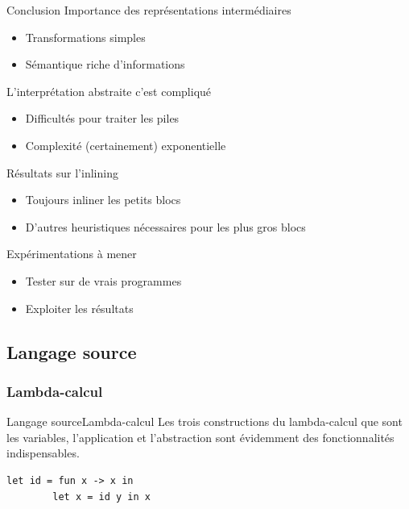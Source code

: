 \documentclass{beamer}
\begin{document}
\begin{frame}{Conclusion}
    Importance des représentations intermédiaires

    \begin{itemize}
        \item Transformations simples
        \item Sémantique riche d'informations
    \end{itemize}

    L'interprétation abstraite c'est compliqué

    \begin{itemize}
        \item Difficultés pour traiter les piles
        \item Complexité (certainement) exponentielle
    \end{itemize}

    Résultats sur l'inlining

    \begin{itemize}
        \item Toujours inliner les petits blocs
        \item D'autres heuristiques nécessaires pour les plus gros blocs
    \end{itemize}

    Expérimentations à mener

    \begin{itemize}
        \item Tester sur de vrais programmes
        \item Exploiter les résultats
    \end{itemize}
\end{frame}



\iffalse
\subsection{Langage source}

\subsubsection{Lambda-calcul}

\begin{frame}[fragile]{Langage source}{Lambda-calcul}
    Les trois constructions du lambda-calcul que sont les variables, l'application et l'abstraction sont évidemment des fonctionnalités indispensables.
    \begin{lstlisting}[language=caml]
        let id = fun x -> x in
        let x = id y in x
    \end{lstlisting}
\end{frame}
\end{document}
